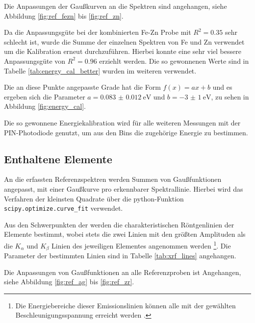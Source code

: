 

Die Anpassungen der Gaußkurven an die Spektren sind angehangen, siehe Abbildung \ref{fig:ref_fezn} bis \ref{fig:ref_zn}.

Da die Anpassungsgüte bei der kombinierten Fe-Zn Probe mit $R^2 = 0.35$ sehr schlecht ist, wurde die Summe der einzelnen Spektren von Fe und Zn verwendet um die Kalibration erneut durchzuführen. Hierbei konnte eine sehr viel bessere Anpassungsgüte von $R^2={0.96}$ erziehlt werden. Die so gewonnenen Werte sind in Tabelle \ref{tab:energy_cal_better} wurden im weiteren verwendet.

Die an diese Punkte angepasste Grade hat die Form $f(x) = a x + b$ und es ergeben sich die Parameter $a = \SI{0.083(12)}{\electronvolt}$ und $b = \SI{-3(1)}{\electronvolt}$, zu sehen in Abbildung \ref{fig:energy_cal}.

Die so gewonnene Energiekalibration wird für alle weiteren Messungen mit der PIN-Photodiode genutzt, um aus den Bins die zugehörige Energie zu bestimmen.


\subsection{Enthaltene Elemente}
An die erfassten Referenzspektren werden Summen von Gaußfunktionen angepasst, mit einer Gaußkurve pro erkennbarer Spektrallinie. Hierbei wird das Verfahren der kleinsten Quadrate über die python-Funktion \texttt{scipy.optimize.curve\_fit} verwendet.

Aus den Schwerpunkten der  werden die charakteristischen Röntgenlinien der Elemente bestimmt, wobei stets die zwei Linien mit den größten Amplituden als die $K_\alpha$ und $K_\beta$ Linien des jeweiligen Elementes angenommen werden \footnote{Die Energiebereiche dieser Emissionslinien können alle mit der gewählten Beschleunigungsspannung erreicht werden \cite{NISTxray}.}. Die Parameter der bestimmten Linien sind in Tabelle \ref{tab:xrf_lines} angehangen.

Die Anpassungen von Gaußfunktionen an alle Referenzproben ist Angehangen, siehe Abbildung \ref{fig:ref_ag} bis \ref{fig:ref_zr}.

